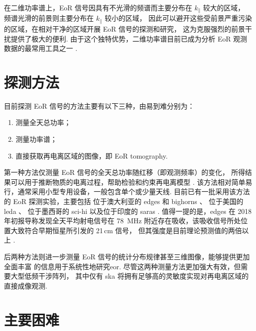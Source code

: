 在二维功率谱上，EoR 信号因具有不光滑的频谱而主要分布在 $k_{\parallel}$ 较大的区域，
频谱光滑的前景则主要分布在 $k_{\parallel}$ 较小的区域，
因此可以避开这些受前景严重污染的区域，在相对干净的区域开展 EoR 信号的探测和研究，
这为克服强烈的前景干扰提供了极大的便利.
由于这个独特优势，二维功率谱目前已成为分析 EoR 观测数据的最常用工具之一
\cite{trott2012,thyagarajan2013,barry2016,beardsley2016,trott2016,patil2017}.


\section{探测方法}
\label{sec:det-methods}

目前探测 EoR 信号的方法主要有以下三种，由易到难分别为：
\begin{enumerate}
  \item 测量全天总功率；
  \item 测量功率谱；
  \item 直接获取再电离区域的图像，即 EoR \ac{tomography}.
\end{enumerate}

第一种方法仅测量 EoR 信号的全天总功率随红移（即观测频率）的变化，
所得结果可以用于推断物质的电离过程，帮助检验和约束再电离模型
\cite{pritchard2012,liu2016}.
该方法相对简单易行，通常采用小型专用设备，一般包含单个或少量天线.
目前已有一批采用该方法的 EoR 探测实验，主要包括
位于澳大利亚的 \ac{edges} \cite{bowman2008} 和
\ac{bighorns} \cite{sokolowski2015}、
位于美国的 \ac{leda} \cite{greenhill2012}、
位于墨西哥的 \ac{sci-hi} \cite{voytek2014}
以及位于印度的 \ac{saras} \cite{singh2018}.
值得一提的是，\acs{edges} 在 2018 年初报导称发现全天平均射电信号在 \SI{78}{\MHz}
附近存在吸收，该吸收信号所处位置大致符合早期恒星所引发的 21\,cm 信号，
但其强度是目前理论预测值的两倍以上 \cite{bowman2018}.

后两种方法则进一步测量 EoR 信号的统计分布规律甚至三维图像，能够提供更加全面丰富
的信息用于系统性地研究\acl{eor}.
尽管这两种测量方法更加强大有效，但需要大型低频干涉阵列，
其中仅有 \acs{ska} 将拥有足够高的灵敏度实现对再电离区域的直接成像观测.


\section{主要困难}
\label{sec:det-difficulties}

